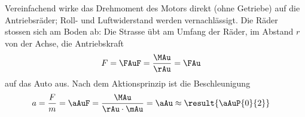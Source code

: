 Vereinfachend wirke das Drehmoment des Motors direkt (ohne Getriebe) auf die Antriebsräder; Roll- und Luftwiderstand werden vernachlässigt. Die Räder stossen sich am Boden ab: Die Strasse übt am Umfang der Räder, im Abstand $r$ von der Achse, die Antriebskraft
\begin{align}
 F &= \FAuF = \frac{\MAu}{\rAu} = \FAu
\end{align}
auf das Auto aus. Nach dem Aktionsprinzip ist die Beschleunigung
\begin{align}
 a &= \frac{F}{m} = \aAuF = \frac{\MAu}{\rAu\cdot\mAu} = \aAu \approx \result{\aAuP{0}{2}}
\end{align}
